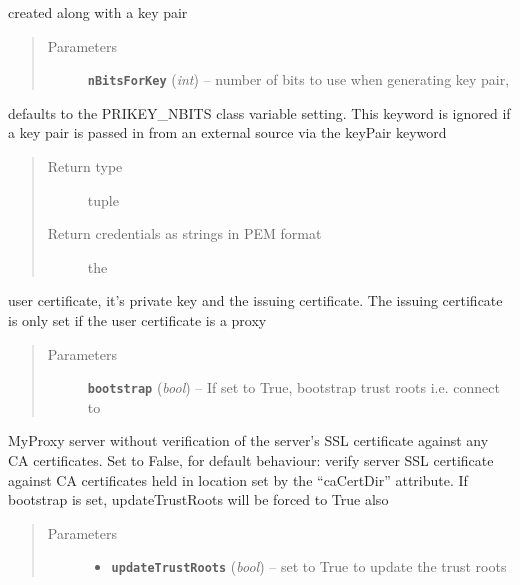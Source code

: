 \documentclass[letterpaper,10pt,english]{sphinxmanual}
\begin{document}
\begin{fulllineitems}
\begin{fulllineitems}
\begin{quote}
\begin{description}
\end{description}\end{quote}

created along with a key pair
\begin{quote}\begin{description}
\item[{Parameters}] \leavevmode
\textbf{\texttt{nBitsForKey}} (\emph{int}) -- number of bits to use when generating key pair,

\end{description}\end{quote}

defaults to the PRIKEY\_NBITS class variable setting.  This keyword is
ignored if a key pair is passed in from an external source via the
keyPair keyword
\begin{quote}\begin{description}
\item[{Return type}] \leavevmode
tuple

\item[{Return credentials as strings in PEM format}] \leavevmode
the

\end{description}\end{quote}

user certificate, it's private key and the issuing certificate.  The
issuing certificate is only set if the user certificate is a proxy
\begin{quote}\begin{description}
\item[{Parameters}] \leavevmode
\textbf{\texttt{bootstrap}} (\emph{bool}) -- If set to True, bootstrap trust roots i.e. connect to

\end{description}\end{quote}

MyProxy server without verification of the server's SSL certificate
against any CA certificates.  Set to False, for default behaviour:
verify server SSL certificate against CA certificates held in location
set by the ``caCertDir'' attribute.  If bootstrap is set, updateTrustRoots
will be forced to True also
\begin{quote}\begin{description}
\item[{Parameters}] \leavevmode\begin{itemize}
\item {} 
\textbf{\texttt{updateTrustRoots}} (\emph{bool}) -- set to True to update the trust roots


\end{itemize}
\end{description}
\end{quote}
\end{fulllineitems}
\end{fulllineitems}
\end{document}
